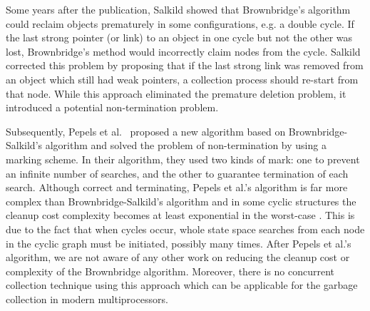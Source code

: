 Some years after the publication, Salkild \cite{Salkild1987} showed that Brownbridge's algorithm
\cite{Brownbridge1985} could reclaim objects prematurely in some
configurations, e.g. a double cycle. If the last strong pointer (or link) to
an object in one cycle but not the other was lost, Brownbridge's
method would incorrectly claim nodes from the cycle.
Salkild \cite{Salkild1987} corrected this problem by proposing
that if the last strong link was removed from an object which still
had weak pointers, a collection process should re-start from that node.
While this approach eliminated the premature deletion problem, it introduced a
potential non-termination problem.

Subsequently, Pepels et al.~\cite{Pepels1988} proposed a new algorithm based on
Brownbridge-Salkild's algorithm and solved the problem of non-termination by
using a marking scheme. In their algorithm, they used two kinds of mark: one to
prevent an infinite number of searches, and the other to guarantee termination
of each search. Although correct and terminating, Pepels et al.'s algorithm is far more
complex than Brownbridge-Salkild's algorithm and in some cyclic structures the
cleanup cost complexity becomes at least
exponential in the worst-case \cite{Jones1996}. This is due to the fact that when
cycles occur, whole state space searches from
each node in the cyclic graph must be initiated, possibly many times. After Pepels et al.'s algorithm, we are not aware
of any other work on reducing the cleanup cost or complexity of the Brownbridge
algorithm. Moreover, there is no concurrent collection technique using this approach which can be applicable for the garbage collection in modern multiprocessors.

